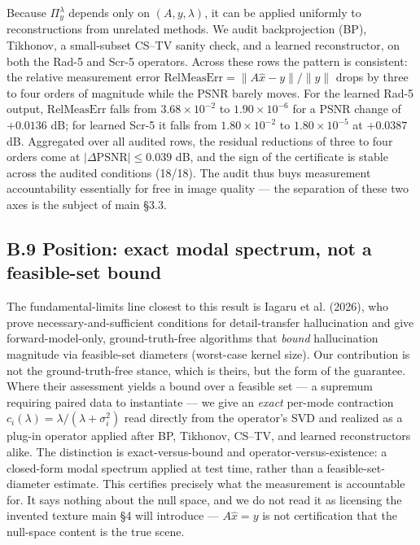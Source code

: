 \documentclass[11pt]{article}
\begin{document}
Because $\Pi_y^\lambda$ depends only on $(A, y, \lambda)$, it can be applied uniformly to reconstructions from unrelated methods. We audit backprojection (BP), Tikhonov, a small-subset CS--TV sanity check, and a learned reconstructor, on both the Rad-5 and Scr-5 operators. Across these rows the pattern is consistent: the relative measurement error $\mathrm{RelMeasErr} = \lVert A\hat{x} - y\rVert / \lVert y\rVert$ drops by three to four orders of magnitude while the PSNR barely moves. For the learned Rad-5 output, $\mathrm{RelMeasErr}$ falls from $3.68\times10^{-2}$ to $1.90\times10^{-6}$ for a PSNR change of $+0.0136$ dB; for learned Scr-5 it falls from $1.80\times10^{-2}$ to $1.80\times10^{-5}$ at $+0.0387$ dB. Aggregated over all audited rows, the residual reductions of three to four orders come at $|\Delta\mathrm{PSNR}| \le 0.039$ dB, and the sign of the certificate is stable across the audited conditions (18/18). The audit thus buys measurement accountability essentially for free in image quality --- the separation of these two axes is the subject of main §3.3.

\subsection*{B.9 Position: exact modal spectrum, not a feasible-set bound}

The fundamental-limits line closest to this result is Iagaru et al. (2026), who prove necessary-and-sufficient conditions for detail-transfer hallucination and give forward-model-only, ground-truth-free algorithms that \textit{bound} hallucination magnitude via feasible-set diameters (worst-case kernel size). Our contribution is not the ground-truth-free stance, which is theirs, but the form of the guarantee. Where their assessment yields a bound over a feasible set --- a supremum requiring paired data to instantiate --- we give an \textit{exact} per-mode contraction $c_i(\lambda) = \lambda/(\lambda + \sigma_i^2)$ read directly from the operator's SVD and realized as a plug-in operator applied after BP, Tikhonov, CS--TV, and learned reconstructors alike. The distinction is exact-versus-bound and operator-versus-existence: a closed-form modal spectrum applied at test time, rather than a feasible-set-diameter estimate. This certifies precisely what the measurement is accountable for. It says nothing about the null space, and we do not read it as licensing the invented texture main §4 will introduce --- $A\hat{x} = y$ is not certification that the null-space content is the true scene.
\end{document}
